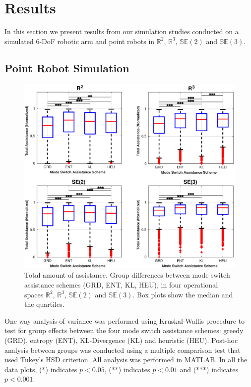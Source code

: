 \documentclass[conference]{IEEEtran}
\begin{document}
\section{Results}\label{sec:results}

In this section we present results from our simulation studies conducted on a simulated 6-DoF robotic arm and point robots in $\mathbb{R}^2$, $\mathbb{R}^3$, $\mathbb{SE}(2)$ and $\mathbb{SE}(3)$. 
\subsection{Point Robot Simulation}
\begin{figure}[t]
	\centering
	\includegraphics[width= 1.\hsize, height=0.3\vsize]{./figures/total_assistance.eps}
	\vspace{-0.8cm}
	\caption{Total amount of assistance. Group differences between mode switch assistance schemes (GRD, ENT, KL, HEU), in four operational spaces $\mathbb{R}^2$, $\mathbb{R}^3$, $\mathbb{SE}(2)$ and $\mathbb{SE}(3)$. Box plots show the median and the quartiles.} 
	\label{fig:total_assistance}
\end{figure}
One way analysis of variance was performed using Kruskal-Wallis procedure to test for group effects  between the four mode switch assistance schemes: greedy (GRD), entropy (ENT), KL-Divergence (KL) and heuristic (HEU). Post-hoc analysis between groups was conducted using a multiple comparison test that used Tukey's HSD criterion. All analysis was performed in MATLAB. In all the data plots, (*) indicates $p < 0.05$, (**) indicates $p < 0.01$ and (***) indicates $p < 0.001$.
\end{document}
